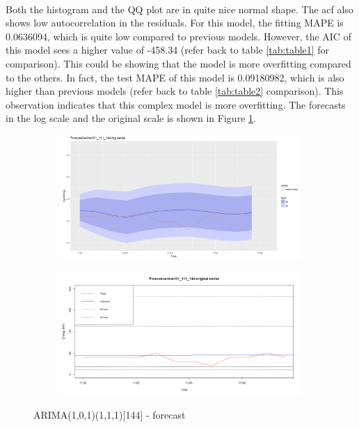 \documentclass[12pt]{article}
\begin{document}
\paragraph{}
Both the histogram and the QQ plot are in quite nice normal shape. The acf also shows low autocorrelation in the residuals. For this model, the fitting MAPE is 0.0636094, which is quite low compared to previous models. However, the AIC of this model sees a higher value of -458.34 (refer back to table \ref{tab:table1} for comparison). This could be showing that the model is more overfitting compared to the others. In fact, the test MAPE of this model is 0.09180982, which is also higher than previous models (refer back to table \ref{tab:table2} comparison). This observation indicates that this complex model is more overfitting. The forecasts in the log scale and the original scale is shown in Figure \ref{fig:figure16}.
\begin{figure}[H]
  \centering
  \begin{subfigure}[b]{1\linewidth}
    \includegraphics[width=\linewidth]{figure15-5.png}
  \end{subfigure}
  \begin{subfigure}[b]{1\linewidth}
    \includegraphics[width=\linewidth]{figure15-6.png}
  \end{subfigure}
  \caption{ARIMA(1,0,1)(1,1,1)[144] - forecast}
  \label{fig:figure16}
\end{figure}
\end{document}
